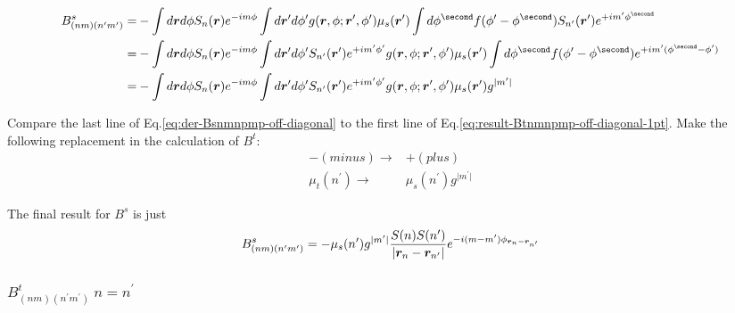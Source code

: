 \documentclass [10pt,letterpaper]{article}
\begin{document}
\begin{equation} \label{eq:der-Bsnmnpmp-off-diagonal}
	\begin{split}
		B^s_{(n m)(n^\prime m^\prime)}
		=&
		-\int d\vectorsym{r} d\phi
		S_n(\vectorsym{r})
		e^{-i m \phi}
		\int d\vectorsym{r}^\prime d\phi^\prime
		g(\vectorsym{r},\phi;\vectorsym{r}^\prime,\phi^\prime)
		\mu_s(\vectorsym{r}^\prime)
		\int d\phi^\second
		f(\phi^\prime-\phi^\second)
		S_{n^\prime}(\vectorsym{r}^\prime)
		e^{+i m^\prime \phi^\second}
		\\
		=&
		-\int d\vectorsym{r} d\phi
		S_n(\vectorsym{r})
		e^{-i m \phi}
		\int d\vectorsym{r}^\prime d\phi^\prime
		S_{n^\prime}(\vectorsym{r}^\prime)
		e^{+i m^\prime \phi^\prime}
		g(\vectorsym{r},\phi;\vectorsym{r}^\prime,\phi^\prime)
		\mu_s(\vectorsym{r}^\prime)
		\int d\phi^\second
		f(\phi^\prime-\phi^\second)
		e^{+i m^\prime (\phi^\second-\phi^\prime)}
		\\
		=&
		-\int d\vectorsym{r} d\phi
		S_n(\vectorsym{r})
		e^{-i m \phi}
		\int d\vectorsym{r}^\prime d\phi^\prime
		S_{n^\prime}(\vectorsym{r}^\prime)
		e^{+i m^\prime \phi^\prime}
		g(\vectorsym{r},\phi;\vectorsym{r}^\prime,\phi^\prime)
		\mu_s(\vectorsym{r}^\prime)
		g^{\lvert m^\prime \rvert}
	\end{split}
\end{equation}

Compare the last line of Eq.\eqref{eq:der-Bsnmnpmp-off-diagonal} to the first line of Eq.\eqref{eq:result-Btnmnpmp-off-diagonal-1pt}. Make the following replacement in the calculation of $B^t$:
\begin{align*}
	-(minus)	 \rightarrow & +(plus)
	\\
	\mu_t(n^\prime)	 \rightarrow & \mu_s(n^\prime)g^{\lvert m^\prime \rvert}
\end{align*}

The final result for $B^s$ is just
\begin{equation} \label{eq:result-Bsnmnpmp-off-diagonal-1pt}
	B^s_{(n m)(n^\prime m^\prime)}
	=
	-
	\mu_s(n^\prime)g^{\lvert m^\prime \rvert} 
	\frac{S(n) S(n^\prime)}{\lvert\vectorsym{r}_n-\vectorsym{r}_{n^\prime}\rvert}
	e^{-i (m-m^\prime) \phi_{\vectorsym{r}_n-\vectorsym{r}_{n^\prime}}}
\end{equation}

\subsubsection{$B^t_{(n m)(n^\prime m^\prime)} \ n=n^\prime$}
\label{subsub:Btnmnpmp-diagonal}
\end{document}
